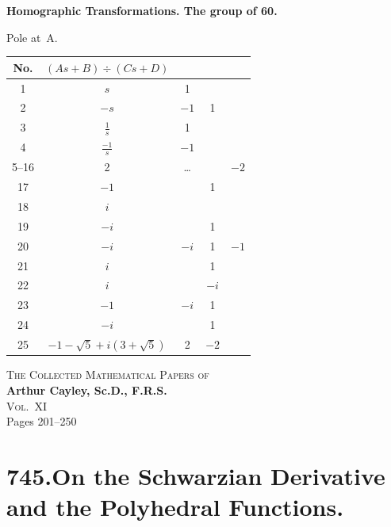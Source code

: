 \documentclass[11pt,a4paper]{book}
\begin{document}
\begin{art}
\textbf{Homographic Transformations. The group of 60.}

Pole at~A.

\begin{center}
\begin{longtable}{|c|c|c|c|c|}
\hline
No. & $(As+B) \div (Cs+D)$ & & & \\
\hline
1 & $s$ & 1 & & \\
2 & $-s$ & $-1$ & 1 & \\
3 & $\frac{1}{s}$ & 1 & & \\
4 & $\frac{-1}{s}$ & $-1$ & & \\
5--16 & 2 & \ldots & & $-2$ \\
17 & $-1$ & & 1 & \\
18 & $i$ & & & \\
19 & $-i$ & & 1 & \\
20 & $-i$ & $-i$ & 1 & $-1$ \\
21 & $i$ & & 1 & \\
22 & $i$ & & $-i$ & \\
23 & $-1$ & $-i$ & 1 & \\
24 & $-i$ & & 1 & \\
25 & $-1-\sqrt{5}+i(3+\sqrt{5})$ & 2 & $-2$ & \\
\hline
\end{longtable}
\end{center}
\end{art}
\clearpage


\begin{center}
  \LARGE\textsc{The Collected Mathematical Papers of}\\[0.5em]
  \LARGE\textbf{Arthur Cayley, Sc.D., F.R.S.}\\[1em]
  \Large\textsc{Vol.~XI}\\[2em]
  \large Pages 201--250
\end{center}

\vspace{2em}


\newpage
\section*{\textbf{745.}\quad On the Schwarzian Derivative and the Polyhedral Functions.}
\end{document}
